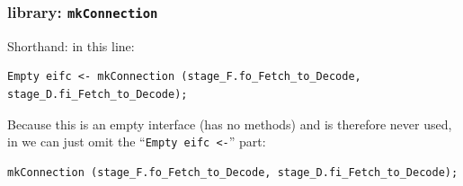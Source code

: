 
\begin{frame}[fragile]
\frametitle{{\BSV} library: {\tt mkConnection}}

\footnotesize

Shorthand: in this line:

\vspace{1ex}

\begin{Verbatim}[frame=single]
   Empty eifc <- mkConnection (stage_F.fo_Fetch_to_Decode, stage_D.fi_Fetch_to_Decode);
\end{Verbatim}

\vspace{1ex}

Because this is an empty interface (has no methods) and is therefore
never used, in {\BSV} we can just omit the ``{\tt Empty eifc <-}''
part:

\vspace{1ex}

\begin{Verbatim}[frame=single]
   mkConnection (stage_F.fo_Fetch_to_Decode, stage_D.fi_Fetch_to_Decode);
\end{Verbatim}

\end{frame}


